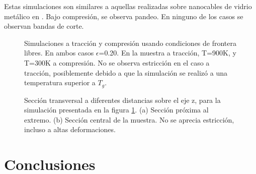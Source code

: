 Estas simulaciones son similares a aquellas realizadas sobre nanocables de vidrio metálico en \cite{xiao12}. Bajo compresión, se observa pandeo. En ninguno de los casos se observan bandas de corte.


\begin{figure}[htp]
\centering
{}
\caption[Simulaciones a tracción y compresión usando condiciones de frontera libres.]{Simulaciones a tracción y compresión usando condiciones de frontera libres. En ambos casos $\epsilon$=0.20. En la muestra a tracción, T=900K, y T=300K a compresión. No se observa estricción en el caso a tracción, posiblemente debido a que la simulación se realizó a una temperatura superior a $T_g$.}
\label{C3:fg:libres}
\end{figure}

\begin{figure}[htp]
\centering
{}
\caption[Sección transversal a diferentes distancias sobre el eje z, para la simulación presentada en la figura \ref{C3:fg:libres}]{Sección transversal a diferentes distancias sobre el eje z, para la simulación presentada en la figura \ref{C3:fg:libres}. (a) Sección próxima al extremo. (b) Sección central de la muestra. No se aprecia estricción, incluso a altas deformaciones.}
\label{C3:fg:cross}
\end{figure}

\section{Conclusiones}



